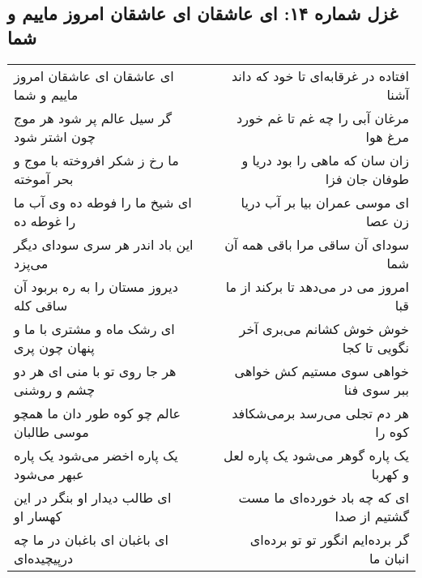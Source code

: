\begin{center}
\section*{غزل شماره ۱۴: ای عاشقان ای عاشقان امروز ماییم و شما}
\label{sec:0014}
\begin{longtable}{l p{0.5cm} r}
ای عاشقان ای عاشقان امروز ماییم و شما
&&
افتاده در غرقابه‌ای تا خود که داند آشنا
\\
گر سیل عالم پر شود هر موج چون اشتر شود
&&
مرغان آبی را چه غم تا غم خورد مرغ هوا
\\
ما رخ ز شکر افروخته با موج و بحر آموخته
&&
زان سان که ماهی را بود دریا و طوفان جان فزا
\\
ای شیخ ما را فوطه ده وی آب ما را غوطه ده
&&
ای موسی عمران بیا بر آب دریا زن عصا
\\
این باد اندر هر سری سودای دیگر می‌پزد
&&
سودای آن ساقی مرا باقی همه آن شما
\\
دیروز مستان را به ره بربود آن ساقی کله
&&
امروز می در می‌دهد تا برکند از ما قبا
\\
ای رشک ماه و مشتری با ما و پنهان چون پری
&&
خوش خوش کشانم می‌بری آخر نگویی تا کجا
\\
هر جا روی تو با منی ای هر دو چشم و روشنی
&&
خواهی سوی مستیم کش خواهی ببر سوی فنا
\\
عالم چو کوه طور دان ما همچو موسی طالبان
&&
هر دم تجلی می‌رسد برمی‌شکافد کوه را
\\
یک پاره اخضر می‌شود یک پاره عبهر می‌شود
&&
یک پاره گوهر می‌شود یک پاره لعل و کهربا
\\
ای طالب دیدار او بنگر در این کهسار او
&&
ای که چه باد خورده‌ای ما مست گشتیم از صدا
\\
ای باغبان ای باغبان در ما چه درپیچیده‌ای
&&
گر برده‌ایم انگور تو تو برده‌ای انبان ما
\\
\end{longtable}
\end{center}
